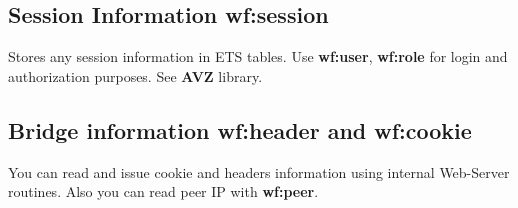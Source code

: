 \subsection{Session Information {\bf wf:session}}
Stores any session information in ETS tables. Use {\bf wf:user}, {\bf wf:role} for
login and authorization purposes. See {\bf AVZ} library.

\subsection{Bridge information {\bf wf:header} and {\bf wf:cookie}}
You can read and issue cookie and headers information using internal Web-Server routines.
Also you can read peer IP with {\bf wf:peer}.

